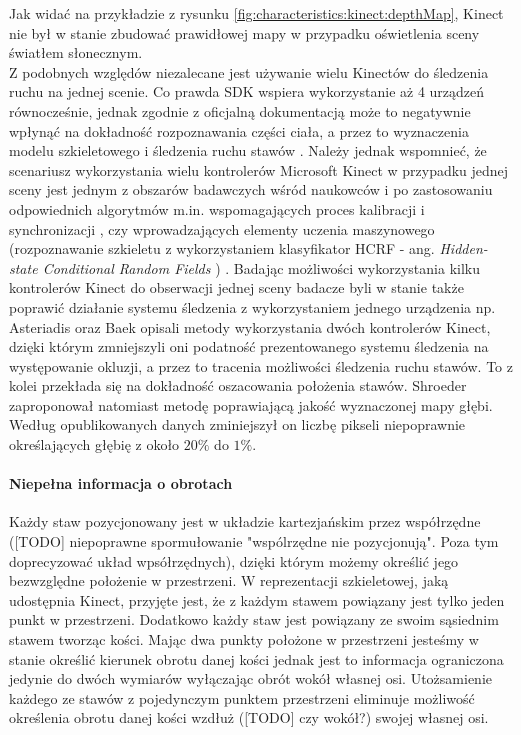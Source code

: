 	Jak widać na przykładzie z rysunku \ref{fig:characteristics:kinect:depthMap}, Kinect nie był w stanie zbudować prawidłowej mapy w przypadku oświetlenia sceny światłem słonecznym. \\
	Z podobnych względów niezalecane jest używanie wielu Kinectów do śledzenia ruchu na jednej scenie. Co prawda SDK wspiera wykorzystanie aż 4 urządzeń równocześnie, jednak zgodnie z oficjalną dokumentacją może to negatywnie wpłynąć na dokładność rozpoznawania części ciała, a przez to wyznaczenia modelu szkieletowego i śledzenia ruchu stawów \cite{msdn:multipleKinectsSDK2016}. Należy jednak wspomnieć, że scenariusz wykorzystania wielu kontrolerów Microsoft Kinect w przypadku jednej sceny jest jednym z obszarów badawczych wśród naukowców i po zastosowaniu odpowiednich algorytmów m.in.  wspomagających proces kalibracji i synchronizacji \cite{Kohno2013}, czy wprowadzających elementy uczenia maszynowego (rozpoznawanie szkieletu z wykorzystaniem klasyfikator HCRF - ang. \emph{Hidden-state Conditional Random Fields }) \cite{Kitsikidis2011}. Badając możliwości wykorzystania kilku kontrolerów Kinect do obserwacji jednej sceny badacze byli w stanie także poprawić działanie systemu śledzenia z wykorzystaniem jednego urządzenia np. Asteriadis \cite{Asteriadis2013} oraz Baek \cite{Baek2014} opisali metody wykorzystania dwóch kontrolerów Kinect, dzięki którym zmniejszyli oni podatność prezentowanego systemu śledzenia na występowanie okluzji, a przez to tracenia możliwości śledzenia ruchu stawów. To z kolei przekłada się na dokładność oszacowania położenia stawów. Shroeder \cite{Schroder2011} zaproponował natomiast metodę poprawiającą jakość wyznaczonej mapy głębi. Według opublikowanych danych zminiejszył on liczbę pikseli niepoprawnie określających głębię z około $20\%$ do $1\%$.
	
	\paragraph*{Niepełna informacja o obrotach}
	Każdy staw pozycjonowany jest w układzie kartezjańskim przez współrzędne ([TODO] niepoprawne spormułowanie "wspólrzędne nie pozycjonują". Poza tym doprecyzować układ wpsółrzędnych), dzięki którym możemy określić jego bezwzględne położenie w przestrzeni. W reprezentacji szkieletowej, jaką udostępnia Kinect, przyjęte jest, że z każdym stawem powiązany jest tylko jeden punkt w przestrzeni. Dodatkowo każdy staw jest powiązany ze swoim sąsiednim stawem tworząc kości. Mając dwa punkty położone w przestrzeni jesteśmy w stanie określić kierunek obrotu danej kości jednak jest to informacja ograniczona jedynie do dwóch wymiarów wyłączając obrót wokół własnej osi. Utożsamienie każdego ze stawów z pojedynczym punktem przestrzeni eliminuje możliwość określenia obrotu danej kości wzdłuż ([TODO] czy wokół?) swojej własnej osi.
	
